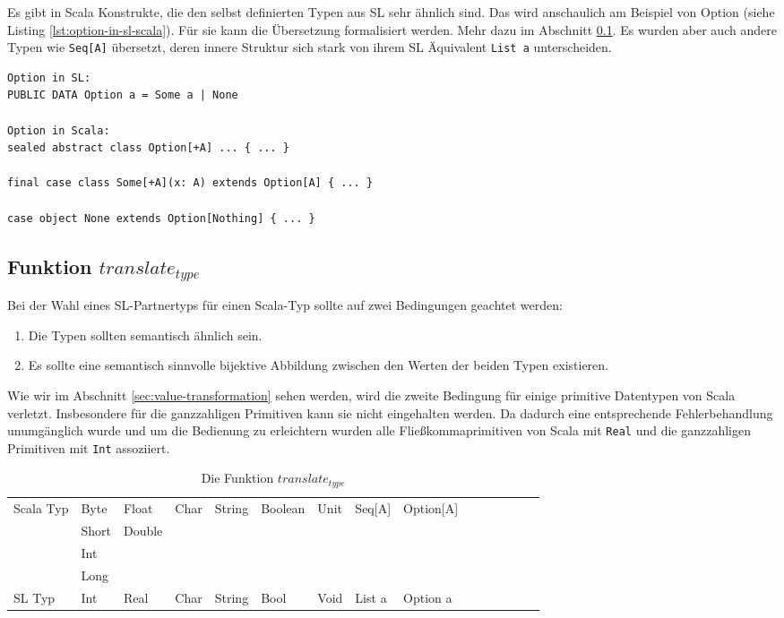 \documentclass[12pt,bibtotoc]{scrreprt}
\begin{document}
Es gibt in Scala Konstrukte, die den selbst definierten Typen aus \ac{SL} sehr ähnlich sind. Das wird anschaulich am Beispiel von Option (siehe Listing \ref{lst:option-in-sl-scala}). Für sie kann die Übersetzung formalisiert werden. Mehr dazu im Abschnitt \ref{subsec:translate_type}. Es wurden aber auch andere Typen wie \lstinline!Seq[A]! übersetzt, deren innere Struktur sich stark von ihrem SL Äquivalent \lstinline!List a! unterscheiden.

\begin{lstlisting}[caption=Option in \ac{SL} und Scala, label=lst:option-in-sl-scala, float=h]
Option in SL:
PUBLIC DATA Option a = Some a | None

Option in Scala:
sealed abstract class Option[+A] ... { ... }

final case class Some[+A](x: A) extends Option[A] { ... }

case object None extends Option[Nothing] { ... }
\end{lstlisting}

\subsection{Funktion $translate_{type}$}
\label{subsec:translate_type}


Bei der Wahl eines SL-Partnertyps für einen Scala-Typ sollte auf zwei Bedingungen geachtet werden:

\begin{enumerate}
 \item{Die Typen sollten semantisch ähnlich sein.}
 \item{Es sollte eine semantisch sinnvolle bijektive Abbildung zwischen den Werten der beiden Typen existieren. }
\end{enumerate}

Wie wir im Abschnitt \ref{sec:value-transformation} sehen werden, wird die zweite Bedingung für einige primitive Datentypen von Scala verletzt. Insbesondere für die ganzzahligen Primitiven kann sie nicht eingehalten werden. Da dadurch eine entsprechende Fehlerbehandlung unumgänglich wurde und um die Bedienung zu erleichtern wurden alle Fließkommaprimitiven von Scala mit \lstinline!Real! und die ganzzahligen Primitiven mit \lstinline!Int! assoziiert.

\begin{table}[h]
\caption{Die Funktion $translate_{type}$}
\centering
\begin{tabular}{l|llllllllllllll}
Scala Typ & Byte & Float & Char & String & Boolean & Unit & Seq[A] & Option[A]\\
 & Short & Double\\
 & Int\\
 & Long\\
SL Typ & Int & Real & Char & String & Bool & Void & List a & Option a\\
\end{tabular}
\label{tab:translate_type}
\end{table}
\end{document}

